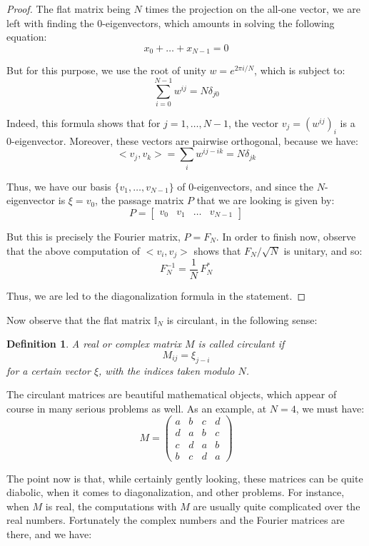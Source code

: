 \documentclass[12pt]{amsbook}
\newtheorem{definition}[theorem]{Definition}
\begin{document}
\begin{proof}
The flat matrix being $N$ times the projection on the all-one vector, we are left with finding the 0-eigenvectors, which amounts in solving the following equation:
$$x_0+\ldots+x_{N-1}=0$$

But for this purpose, we use the root of unity $w=e^{2\pi i/N}$, which is subject to:
$$\sum_{i=0}^{N-1}w^{ij}=N\delta_{j0}$$

Indeed, this formula shows that for $j=1,\ldots,N-1$, the vector $v_j=(w^{ij})_i$ is a 0-eigenvector. Moreover, these vectors are pairwise orthogonal, because we have:
$$<v_j,v_k>
=\sum_iw^{ij-ik}
=N\delta_{jk}$$

Thus, we have our basis $\{v_1,\ldots,v_{N-1}\}$ of 0-eigenvectors, and since the $N$-eigenvector is $\xi=v_0$, the passage matrix $P$ that we are looking is given by:
$$P=\begin{bmatrix}v_0&v_1&\ldots&v_{N-1}\end{bmatrix}$$

But this is precisely the Fourier matrix, $P=F_N$. In order to finish now, observe that the above computation of $<v_i,v_j>$ shows that $F_N/\sqrt{N}$ is unitary, and so:
$$F_N^{-1}=\frac{1}{N}\,F_N^*$$

Thus, we are led to the diagonalization formula in the statement.
\end{proof}

Now observe that the flat matrix $\mathbb I_N$ is circulant, in the following sense:


\begin{definition}
A real or complex matrix $M$ is called circulant if
$$M_{ij}=\xi_{j-i}$$
for a certain vector $\xi$, with the indices taken modulo $N$.
\end{definition}

The circulant matrices are beautiful mathematical objects, which appear of course in many serious problems as well. As an example, at $N=4$, we must have:
$$M=\begin{pmatrix}
a&b&c&d\\
d&a&b&c\\
c&d&a&b\\
b&c&d&a
\end{pmatrix}$$

The point now is that, while certainly gently looking, these matrices can be quite diabolic, when it comes to diagonalization, and other problems. For instance, when $M$ is real, the computations with $M$ are usually quite complicated over the real numbers. Fortunately the complex numbers and the Fourier matrices are there, and we have:
\end{document}
